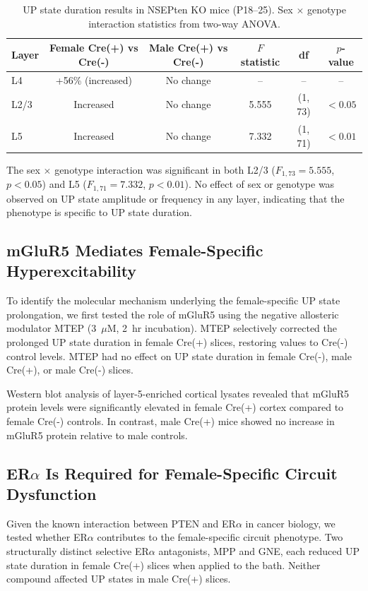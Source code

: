 \documentclass[11pt]{article}
\begin{document}
\begin{table}[htbp]
\centering
\caption{UP state duration results in NSEPten KO mice (P18--25). Sex $\times$ genotype interaction statistics from two-way ANOVA.}
\label{tab:upstates}
\begin{tabular}{lccccc}
\toprule
Layer & Female Cre(+) vs Cre(-) & Male Cre(+) vs Cre(-) & $F$ statistic & df & $p$-value \\
\midrule
L4 & +56\% (increased) & No change & -- & -- & -- \\
L2/3 & Increased & No change & 5.555 & (1, 73) & $< 0.05$ \\
L5 & Increased & No change & 7.332 & (1, 71) & $< 0.01$ \\
\bottomrule
\end{tabular}
\end{table}

The sex $\times$ genotype interaction was significant in both L2/3 ($F_{1,73} = 5.555$, $p < 0.05$) and L5 ($F_{1,71} = 7.332$, $p < 0.01$). No effect of sex or genotype was observed on UP state amplitude or frequency in any layer, indicating that the phenotype is specific to UP state duration.

\subsection{mGluR5 Mediates Female-Specific Hyperexcitability}

To identify the molecular mechanism underlying the female-specific UP state prolongation, we first tested the role of mGluR5 using the negative allosteric modulator MTEP (3~$\mu$M, 2~hr incubation). MTEP selectively corrected the prolonged UP state duration in female Cre(+) slices, restoring values to Cre(-) control levels. MTEP had no effect on UP state duration in female Cre(-), male Cre(+), or male Cre(-) slices.

Western blot analysis of layer-5-enriched cortical lysates revealed that mGluR5 protein levels were significantly elevated in female Cre(+) cortex compared to female Cre(-) controls. In contrast, male Cre(+) mice showed no increase in mGluR5 protein relative to male controls.

\subsection{ER$\alpha$ Is Required for Female-Specific Circuit Dysfunction}

Given the known interaction between PTEN and ER$\alpha$ in cancer biology, we tested whether ER$\alpha$ contributes to the female-specific circuit phenotype. Two structurally distinct selective ER$\alpha$ antagonists, MPP and GNE, each reduced UP state duration in female Cre(+) slices when applied to the bath. Neither compound affected UP states in male Cre(+) slices.
\end{document}
